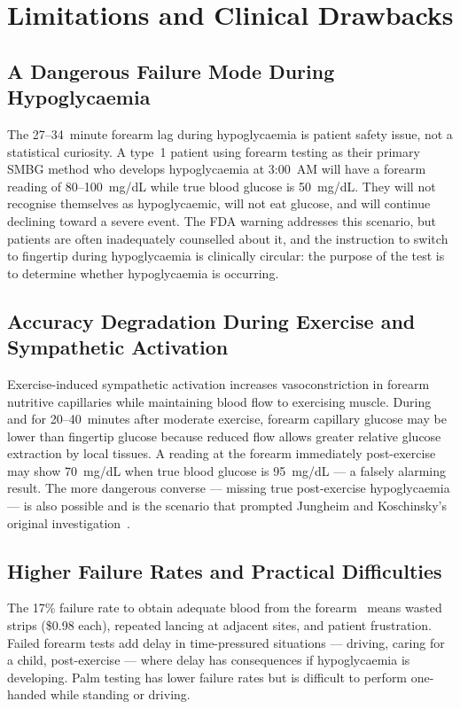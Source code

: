 \section{Limitations and Clinical Drawbacks}

\subsection*{A Dangerous Failure Mode During Hypoglycaemia}

The 27--34~minute forearm lag during hypoglycaemia is patient safety issue, not a statistical curiosity. A type~1 patient using forearm testing as their primary SMBG method who develops hypoglycaemia at 3:00~AM will have a forearm reading of 80--100~mg/dL while true blood glucose is 50~mg/dL. They will not recognise themselves as hypoglycaemic, will not eat glucose, and will continue declining toward a severe event. The FDA warning addresses this scenario, but patients are often inadequately counselled about it, and the instruction to switch to fingertip during hypoglycaemia is clinically circular: the purpose of the test is to determine whether hypoglycaemia is occurring.

\subsection*{Accuracy Degradation During Exercise and Sympathetic Activation}

Exercise-induced sympathetic activation increases vasoconstriction in forearm nutritive capillaries while maintaining blood flow to exercising muscle. During and for 20--40~minutes after moderate exercise, forearm capillary glucose may be  lower than fingertip glucose because reduced flow allows greater relative glucose extraction by local tissues. A reading at the forearm immediately post-exercise may show 70~mg/dL when true blood glucose is 95~mg/dL --- a falsely alarming result. The more dangerous converse --- missing true post-exercise hypoglycaemia --- is also possible and is the scenario that prompted Jungheim and Koschinsky's original investigation~\cite{jungheim2001}.

\subsection*{Higher Failure Rates and Practical Difficulties}

The 17\% failure rate to obtain adequate blood from the forearm~\cite{fedele2003} means wasted strips (\$0.98 each), repeated lancing at adjacent sites, and patient frustration. Failed forearm tests add delay in time-pressured situations --- driving, caring for a child, post-exercise --- where delay has consequences if hypoglycaemia is developing. Palm testing has lower failure rates but is difficult to perform one-handed while standing or driving.

